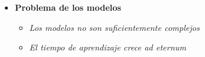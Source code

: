 \documentclass{beamer}
\begin{document}
{\begin{itemize}
	\item \textbf{Problema de los modelos} %
	
	\begin{itemize}
		\item \textit{Los modelos no son suficientemente complejos} %
		
		\item \textit{El tiempo de aprendizaje crece \emph{ad eternum}} %
	\end{itemize}
\end{itemize}

}
\end{document}
